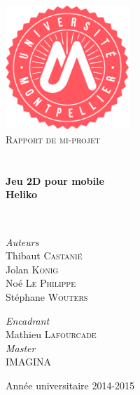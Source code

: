 \begin{titlepage}
\begin{center}

\includegraphics[width=0.35\textwidth]{./img/logoUM}~\\[1cm]

\textsc{\LARGE Rapport de mi-projet}\\[1.5cm]

\textsc{\Large }\\[0.5cm]

\HRule \\[0.4cm]

{\huge \bfseries Jeu 2D pour mobile\\
Heliko \\[0.4cm] }

\HRule \\[1.5cm]

\begin{minipage}{0.4\textwidth}
\begin{flushleft} \large
\emph{Auteurs}\\
Thibaut \textsc{Castanié}\\
Jolan \textsc{Konig}\\
Noé \textsc{Le Philippe}\\
Stéphane \textsc{Wouters}
\end{flushleft}
\end{minipage}
\begin{minipage}{0.4\textwidth}
\begin{flushright} \large
\emph{Encadrant} \\
Mathieu \textsc{Lafourcade}\\
\emph{Master} \\
\textsc{IMAGINA}
\end{flushright}
\end{minipage}

\vfill

{\large Année universitaire 2014-2015}

\end{center}
\end{titlepage}

